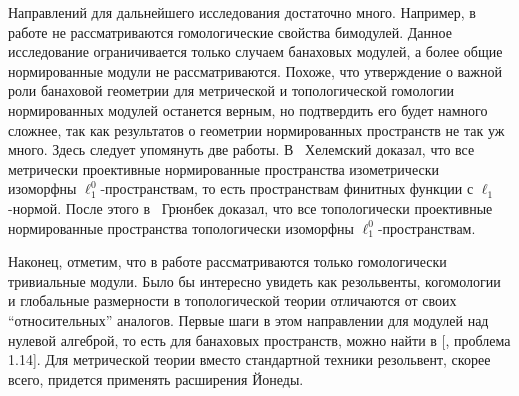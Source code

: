 Направлений для дальнейшего исследования достаточно много. Например, в работе не
рассматриваются гомологические свойства бимодулей. Данное исследование
ограничивается только случаем банаховых модулей, а более общие нормированные
модули не рассматриваются. Похоже, что утверждение о важной роли банаховой
геометрии для метрической и топологической гомологии нормированных модулей
останется верным, но подтвердить его будет намного сложнее, так как результатов
о геометрии нормированных пространств не так уж много. Здесь следует упомянуть
две работы. В~\cite{HelMetrFrQMod} Хелемский доказал, что все метрически
проективные нормированные пространства изометрически изоморфны
$\ell_1^0$-пространствам, то есть пространствам финитных функции с
$\ell_1$-нормой. После этого в~\cite{GronbeakLiftProblmNorSp} Грюнбек доказал,
что все топологически проективные нормированные пространства топологически
изоморфны $\ell_1^0$-пространствам. 

Наконец, отметим, что в работе рассматриваются только гомологически тривиальные
модули. Было бы интересно увидеть как резольвенты, когомологии и глобальные
размерности в топологической теории отличаются от своих ``относительных''
аналогов. Первые шаги в этом направлении для модулей над нулевой алгеброй, то
есть для банаховых пространств, можно найти в [\cite{HavLinComplAnalPrblmBook},
проблема 1.14]. Для метрической теории вместо стандартной техники резольвент,
скорее всего, придется применять расширения Йонеды. 

\clearpage